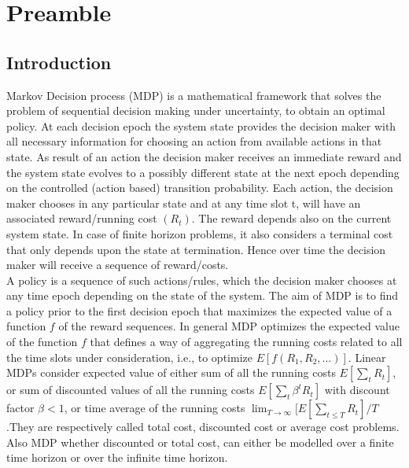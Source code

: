 \documentclass[11pt,a4paper,oneside]{report}
\begin{document}
\chapter{Preamble}
\section{Introduction}
Markov Decision process (MDP) is a mathematical framework that solves the problem of sequential decision making under uncertainty, to obtain an optimal policy. At each decision epoch the system state provides the decision maker with all necessary information for choosing an action from available actions in that state. As result of an action the decision maker receives an immediate reward and the system state evolves to a possibly different state at the next epoch depending on the controlled (action based) transition probability. Each action, the decision maker chooses in any particular state and at any time slot t, will have an associated reward/running cost $(R_t)$. The reward depends also on the current system state. In case of finite horizon problems, it also considers a terminal cost that only depends upon the state at termination. Hence over time the decision maker will receive a sequence of reward/costs.\\

\noindent A policy is a sequence of such actions/rules, which the decision maker chooses at any time epoch depending on the state of the system. The aim of MDP is to find a policy prior to the first decision epoch that maximizes the expected value of a function $f$ of the reward sequences. In general MDP optimizes the expected value of the function $f$ that defines a way of aggregating the running costs related to all the time slots under consideration, i.e., to optimize $E[f(R_1,R_2,...)]$. Linear MDPs consider expected value of either sum of all the running costs $E[\sum_t{R_t} ]$, or sum of discounted values of all the running costs $E[\sum_t{\beta^t {R_t}} ]$ with discount factor $\beta<1$, or time average of the running costs $\lim_{T \to \infty}{[E[ \sum_{t\leq T}{R_t}]}{/T}$ .They are respectively called total cost, discounted cost or average cost problems. Also MDP whether discounted or total cost, can either be modelled over a finite time horizon or over the infinite time horizon. \\
\end{document}
